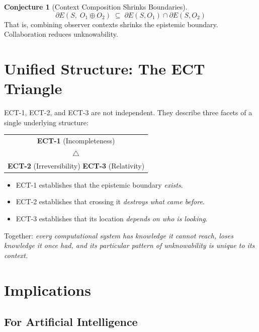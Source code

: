\documentclass[12pt]{article}
\theoremstyle{definition}
\newtheorem{conjecture}{Conjecture}[section]
\begin{document}
\begin{conjecture}[Context Composition Shrinks Boundaries]
\[
  \partial E(S,\; O_1 \oplus O_2) \;\subseteq\; \partial E(S, O_1) \cap \partial E(S, O_2)
\]
That is, combining observer contexts shrinks the epistemic boundary. Collaboration reduces unknowability.
\end{conjecture}

\section{Unified Structure: The ECT Triangle}
\label{sec:unified}

ECT-1, ECT-2, and ECT-3 are not independent. They describe three facets of a single underlying structure:

\begin{center}
\begin{tabular}{c}
\textbf{ECT-1} (Incompleteness) \\
$\triangle$ \\
\textbf{ECT-2} (Irreversibility) \quad\quad \textbf{ECT-3} (Relativity)
\end{tabular}
\end{center}

\begin{itemize}[leftmargin=1.5em]
  \item ECT-1 establishes that the epistemic boundary \emph{exists}.
  \item ECT-2 establishes that crossing it \emph{destroys what came before}.
  \item ECT-3 establishes that its location \emph{depends on who is looking}.
\end{itemize}

Together: \emph{every computational system has knowledge it cannot reach, loses knowledge it once had, and its particular pattern of unknowability is unique to its context.}

\section{Implications}
\label{sec:implications}

\subsection{For Artificial Intelligence}
\end{document}
